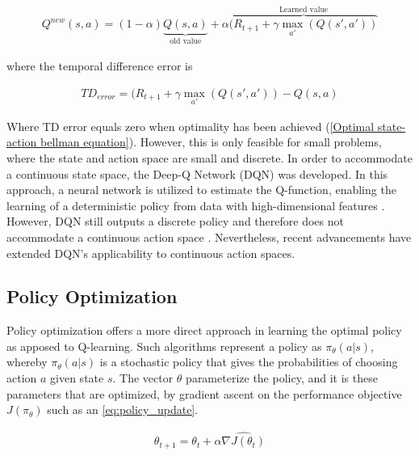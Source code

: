\begin{equation}
	\begin{aligned}
		Q^{new}(s,a) = (1 -\alpha) \underbrace{Q(s,a)}_{\text{old value}} + \alpha \overbrace{(R_{t+1} + \gamma \max_{a'}(Q(s',a'))}^{\text{Learned value}}
	\end{aligned}
	\label{eq:q-learning update}
\end{equation}

where the temporal difference error is

\begin{equation}
	\begin{aligned}
		TD_{error} = (R_{t+1} + \gamma \max_{a'}(Q(s',a')) - Q(s,a)
	\end{aligned}
	\label{eq:temporal difference}
\end{equation}

Where TD error equals zero when optimality has been achieved (\autoref{Optimal state-action bellman equation}). However, this is only feasible for small problems, where the state and action space are small and discrete. In order to accommodate a continuous state space, the Deep-Q Network (DQN) was developed. In this approach, a neural network is utilized to estimate the Q-function, enabling the learning of a deterministic policy from data with high-dimensional features \cite{mnihPlayingAtariDeep2013}. However, DQN still outputs a discrete policy and therefore does not accommodate a continuous action space \cite{mnihPlayingAtariDeep2013}. Nevertheless, recent advancements have extended DQN's applicability to continuous action spaces.

\subsection{Policy Optimization}
Policy optimization offers a more direct approach in learning the optimal policy as apposed to Q-learning. Such algorithms represent a policy as $\pi_{\theta}(a|s)$, whereby $\pi_{\theta}(a|s)$ is a stochastic policy that gives the probabilities of choosing action $a$ given state $s$. The vector $\theta$ parameterize the policy, and it is these parameters that are optimized, by gradient ascent on the performance objective $J(\pi_{\theta})$ such as an \autoref{eq:policy_update}.


\begin{equation}
	\begin{aligned}
		\theta_{t+1} = \theta_{t} + \alpha \hat{\nabla J(\theta_t)}
	\end{aligned}
	\label{eq:policy_update}
\end{equation}

